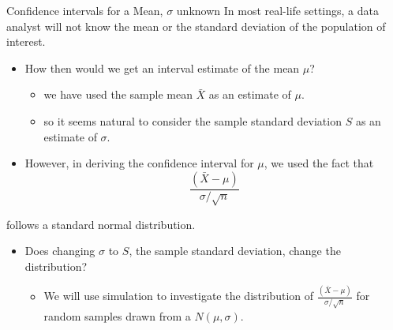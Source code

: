 \documentclass[
  ignorenonframetext,
]{beamer}
\providecommand{\tightlist}{%
  \setlength{\itemsep}{0pt}\setlength{\parskip}{0pt}}
\begin{document}
\begin{frame}{Confidence intervals for a Mean, \(\sigma\) unknown}
\protect\hypertarget{confidence-intervals-for-a-mean-sigma-unknown}{}
In most real-life settings, a data analyst will not know the mean or the
standard deviation of the population of interest.

\begin{itemize}
\item
  How then would we get an interval estimate of the mean \(\mu\)?

  \begin{itemize}
  \tightlist
  \item
    we have used the sample mean \(\bar{X}\) as an estimate of \(\mu\).
  \item
    so it seems natural to consider the sample standard deviation \(S\)
    as an estimate of \(\sigma\).
  \end{itemize}
\item
  However, in deriving the confidence interval for \(\mu\), we used the
  fact that \[\frac{(\bar{X}-\mu)}{\sigma/\sqrt{n}}\]
\end{itemize}

follows a standard normal distribution.

\begin{itemize}
\item
  Does changing \(\sigma\) to \(S\), the sample standard deviation,
  change the distribution?

  \begin{itemize}
  \tightlist
  \item
    We will use simulation to investigate the distribution of
    \(\frac{(\bar{X}-\mu)}{\sigma/\sqrt{n}}\) for random samples drawn
    from a \(N(\mu, \sigma)\).
  \end{itemize}
\end{itemize}
\end{frame}
\end{document}
